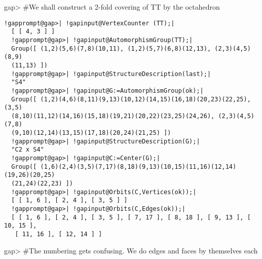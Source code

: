 \documentclass[a4paper,11pt]{report}
\begin{document}
{{{ gap{\textgreater} \#We shall construct a 2-fold covering of TT by the
octahedron 

 
\begin{Verbatim}[commandchars=!@|,fontsize=\small,frame=single,label=Example]
  !gapprompt@gap>| !gapinput@VertexCounter (TT);|
  [ [ 4, 3 ] ]
  !gapprompt@gap>| !gapinput@AutomorphismGroup(TT);|
  Group([ (1,2)(5,6)(7,8)(10,11), (1,2)(5,7)(6,8)(12,13), (2,3)(4,5)(8,9)
  (11,13) ])
  !gapprompt@gap>| !gapinput@StructureDescription(last);|
  "S4"
  !gapprompt@gap>| !gapinput@G:=AutomorphismGroup(ok);|
  Group([ (1,2)(4,6)(8,11)(9,13)(10,12)(14,15)(16,18)(20,23)(22,25), (3,5)
  (8,10)(11,12)(14,16)(15,18)(19,21)(20,22)(23,25)(24,26), (2,3)(4,5)(7,8)
  (9,10)(12,14)(13,15)(17,18)(20,24)(21,25) ])
  !gapprompt@gap>| !gapinput@StructureDescription(G);|
  "C2 x S4"
  !gapprompt@gap>| !gapinput@C:=Center(G);|
  Group([ (1,6)(2,4)(3,5)(7,17)(8,18)(9,13)(10,15)(11,16)(12,14)(19,26)(20,25)
  (21,24)(22,23) ])
  !gapprompt@gap>| !gapinput@Orbits(C,Vertices(ok));|
  [ [ 1, 6 ], [ 2, 4 ], [ 3, 5 ] ]
  !gapprompt@gap>| !gapinput@Orbits(C,Edges(ok));|
  [ [ 1, 6 ], [ 2, 4 ], [ 3, 5 ], [ 7, 17 ], [ 8, 18 ], [ 9, 13 ], [ 10, 15 ], 
   [ 11, 16 ], [ 12, 14 ] ]
\end{Verbatim}
 

 gap{\textgreater} \#The numbering gets confusing. We do edges and faces by
themselves each 

}}}
\end{document}

